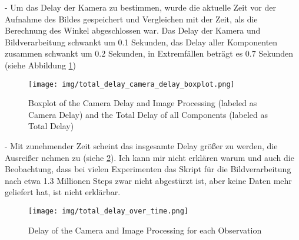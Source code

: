 - Um das Delay der Kamera zu bestimmen, wurde die aktuelle Zeit vor der Aufnahme des Bildes gespeichert und Vergleichen mit der Zeit, als die Berechnung des Winkel abgeschlossen war. Das Delay der Kamera und Bildverarbeitung schwankt um 0.1 Sekunden, das Delay aller Komponenten zusammen schwankt um 0.2 Sekunden, in Extremfällen beträgt es 0.7 Sekunden (siehe Abbildung \ref{fig:camera_delay_boxplot})
\begin{figure}
    \centering
    \texttt{[image: img/total\_delay\_camera\_delay\_boxplot.png]}
    \caption{Boxplot of the Camera Delay and Image Processing (labeled as Camera Delay) and the Total Delay of all Components (labeled as Total Delay)}
    \label{fig:camera_delay_boxplot}
\end{figure}
- Mit zunehmender Zeit scheint das insgesamte Delay größer zu werden, die Ausreißer nehmen zu (siehe \ref{fig:total_delay_over_time}). Ich kann mir nicht erklären warum und auch die Beobachtung, dass bei vielen Experimenten das Skript für die Bildverarbeitung nach etwa 1.3 Millionen Steps zwar nicht abgestürzt ist, aber keine Daten mehr geliefert hat, ist nicht erklärbar.
\begin{figure}
    \centering
    \texttt{[image: img/total\_delay\_over\_time.png]}
    \caption{Delay of the Camera and Image Processing for each Observation}
    \label{fig:total_delay_over_time}
\end{figure}
